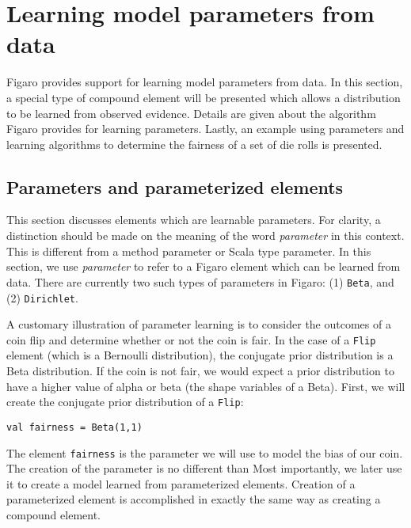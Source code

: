 
\chapter{Learning model parameters from data} %

\label{Learning model parameters from data} %

Figaro provides support for learning model parameters from data. In this section, a special type of compound element will be presented which allows a distribution to be learned from observed evidence. Details are given about the algorithm Figaro provides for learning parameters. Lastly, an example using parameters and learning algorithms to determine the fairness of a set of die rolls is presented.

\section{Parameters and parameterized elements}

This section discusses elements which are learnable parameters. For clarity, a distinction should be made on the meaning of the word \emph{parameter} in this context. This is different from a method parameter or Scala type parameter. In this section, we use \emph{parameter} to refer to a Figaro element which can be learned from data. There are currently two such types of parameters in Figaro: (1) \texttt{Beta}, and (2) \texttt{Dirichlet}.

A customary illustration of parameter learning is to consider the outcomes of a coin flip and determine whether or not the coin is fair. In the case of a \texttt{Flip} element (which is a Bernoulli distribution), the conjugate prior distribution is a Beta distribution. If the coin is not fair, we would expect a prior distribution to have a higher value of alpha or beta (the shape variables of a Beta). First, we will create the conjugate prior distribution of a \texttt{Flip}:

\begin{flushleft}
\texttt{val fairness = Beta(1,1)}
\end{flushleft}

The element \texttt{fairness} is the parameter we will use to model the bias of our coin. The creation of the parameter is no different than  Most importantly, we later use it to create a model learned from parameterized elements. Creation of a parameterized element is accomplished in exactly the same way as creating a compound element.

